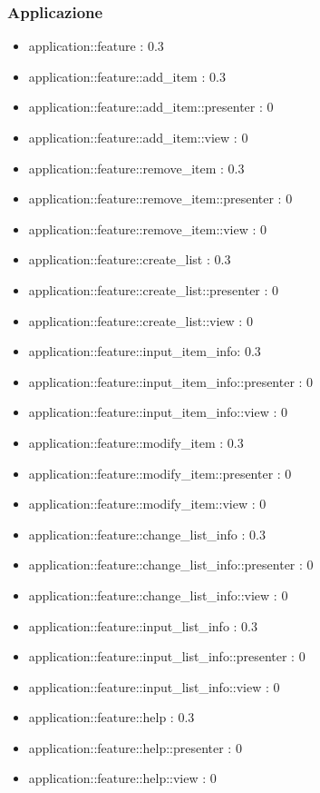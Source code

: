 \subsubsection{Applicazione}

\begin{itemize}

\item application::feature : 0.3
\item application::feature::add\_item : 0.3
\item application::feature::add\_item::presenter : 0
\item application::feature::add\_item::view : 0
\item application::feature::remove\_item : 0.3
\item application::feature::remove\_item::presenter : 0
\item application::feature::remove\_item::view : 0
\item application::feature::create\_list : 0.3
\item application::feature::create\_list::presenter : 0
\item application::feature::create\_list::view : 0
\item application::feature::input\_item\_info: 0.3
\item application::feature::input\_item\_info::presenter : 0
\item application::feature::input\_item\_info::view : 0
\item application::feature::modify\_item : 0.3
\item application::feature::modify\_item::presenter : 0
\item application::feature::modify\_item::view : 0
\item application::feature::change\_list\_info : 0.3
\item application::feature::change\_list\_info::presenter : 0
\item application::feature::change\_list\_info::view : 0
\item application::feature::input\_list\_info : 0.3
\item application::feature::input\_list\_info::presenter : 0
\item application::feature::input\_list\_info::view : 0
\item application::feature::help : 0.3
\item application::feature::help::presenter : 0
\item application::feature::help::view : 0

\end{itemize}
